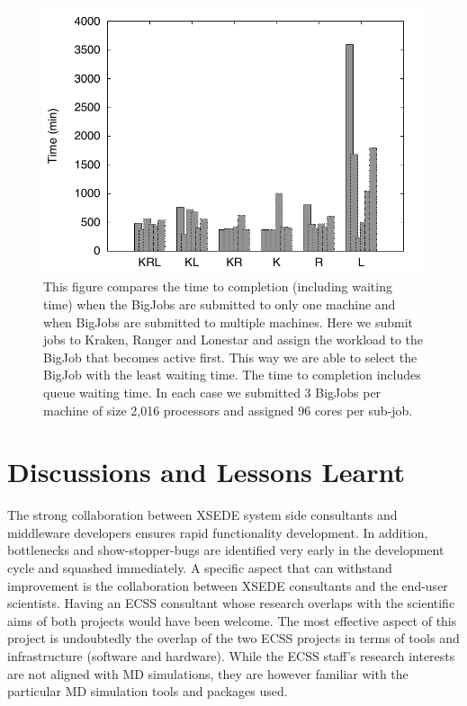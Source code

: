 \documentclass{sig-alternate}
\begin{document}
\begin{figure}
  \centering
  \includegraphics[scale=0.6]{figs/multi_bj_gnu}
  \caption{\footnotesize This figure compares the time to completion
    (including waiting time) when the BigJobs are submitted to only
    one machine and when BigJobs are submitted to multiple
    machines. Here we submit jobs to Kraken, Ranger and Lonestar and
    assign the workload to the BigJob that becomes active first. This
    way we are able to select the BigJob with the least waiting
    time. The time to completion includes queue waiting time. In each
    case we submitted 3 BigJobs per machine of size 2,016 processors
    and assigned 96 cores per sub-job. }
  \label{fig:multi_bigjob}
\end{figure}



\section{Discussions and Lessons Learnt}

The strong collaboration between XSEDE system side consultants
and middleware developers ensures rapid functionality
development. In addition, bottlenecks and show-stopper-bugs are identified very
early in the development cycle and squashed immediately. A specific aspect
that can withstand improvement is the collaboration between XSEDE consultants
and the end-user scientists. Having an ECSS consultant whose research overlaps
with the scientific aims of both projects would have been welcome. The most
effective aspect of this project is undoubtedly the overlap of the two ECSS
projects in terms of tools and infrastructure (software and hardware). While the
ECSS staff's research interests are not aligned with MD simulations, they
are however familiar with the particular MD simulation tools and
packages used.
\end{document}
